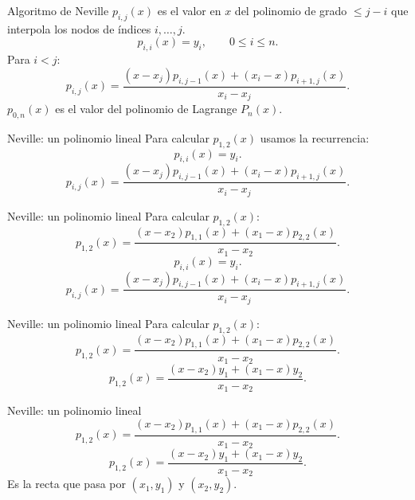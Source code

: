 \documentclass[main.tex]{subfiles}
\begin{document}
\begin{frame}[t]{Algoritmo de Neville}
\small $p_{i,j}(x)$ es el valor en $x$ del polinomio de grado $\le j-i$ que interpola los nodos de índices $i,\ldots,j$.
\[p_{i,i}(x)=y_i,\qquad 0\le i\le n.\]
Para $i<j$:
\[p_{i,j}(x)=\frac{(x-x_j)p_{i,j-1}(x)+(x_i-x)p_{i+1,j}(x)}{x_i-x_j}.\]\medskip $p_{0,n}(x)$ es el valor del polinomio de Lagrange $P_n(x)$.
\end{frame}
\begin{frame}[t]{Neville: un polinomio lineal}
Para calcular $p_{1,2}(x)$ usamos la recurrencia:\[p_{i,i}(x)=y_i.\]\[p_{i,j}(x)=\frac{(x-x_j)p_{i,j-1}(x)+(x_i-x)p_{i+1,j}(x)}{x_i-x_j}.\]
\end{frame}
\begin{frame}[t]{Neville: un polinomio lineal}
Para calcular $p_{1,2}(x)$:\[p_{1,2}(x)=\frac{(x-x_2)p_{1,1}(x)+(x_1-x)p_{2,2}(x)}{x_1-x_2}.\]\[p_{i,i}(x)=y_i.\]\[p_{i,j}(x)=\frac{(x-x_j)p_{i,j-1}(x)+(x_i-x)p_{i+1,j}(x)}{x_i-x_j}.\]
\end{frame}
\begin{frame}[t]{Neville: un polinomio lineal}
Para calcular $p_{1,2}(x)$:\[p_{1,2}(x)=\frac{(x-x_2)p_{1,1}(x)+(x_1-x)p_{2,2}(x)}{x_1-x_2}.\]\[p_{1,2}(x)=\frac{(x-x_2)y_1+(x_1-x)y_2}{x_1-x_2}.\]
\end{frame}
\begin{frame}[t]{Neville: un polinomio lineal}
\[p_{1,2}(x)=\frac{(x-x_2)p_{1,1}(x)+(x_1-x)p_{2,2}(x)}{x_1-x_2}.\]\[p_{1,2}(x)=\frac{(x-x_2)y_1+(x_1-x)y_2}{x_1-x_2}.\]Es la recta que pasa por $(x_1,y_1)$ y $(x_2,y_2)$.
\end{frame}
\end{document}
